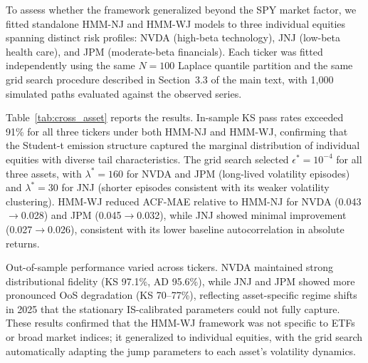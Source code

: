 To assess whether the framework generalized beyond the SPY market factor, we fitted standalone HMM-NJ and HMM-WJ models to three individual equities spanning distinct risk profiles: NVDA (high-beta technology), JNJ (low-beta health care), and JPM (moderate-beta financials). Each ticker was fitted independently using the same $N=100$ Laplace quantile partition and the same grid search procedure described in Section~3.3 of the main text, with 1{,}000 simulated paths evaluated against the observed series.

Table~\ref{tab:cross_asset} reports the results. In-sample KS pass rates exceeded 91\% for all three tickers under both HMM-NJ and HMM-WJ, confirming that the Student-t emission structure captured the marginal distribution of individual equities with diverse tail characteristics. The grid search selected $\epsilon^{*}=10^{-4}$ for all three assets, with $\lambda^{*}=160$ for NVDA and JPM (long-lived volatility episodes) and $\lambda^{*}=30$ for JNJ (shorter episodes consistent with its weaker volatility clustering). HMM-WJ reduced ACF-MAE relative to HMM-NJ for NVDA (0.043$\to$0.028) and JPM (0.045$\to$0.032), while JNJ showed minimal improvement (0.027$\to$0.026), consistent with its lower baseline autocorrelation in absolute returns.

Out-of-sample performance varied across tickers. NVDA maintained strong distributional fidelity (KS 97.1\%, AD 95.6\%), while JNJ and JPM showed more pronounced OoS degradation (KS 70--77\%), reflecting asset-specific regime shifts in 2025 that the stationary IS-calibrated parameters could not fully capture. These results confirmed that the HMM-WJ framework was not specific to ETFs or broad market indices; it generalized to individual equities, with the grid search automatically adapting the jump parameters to each asset's volatility dynamics.

